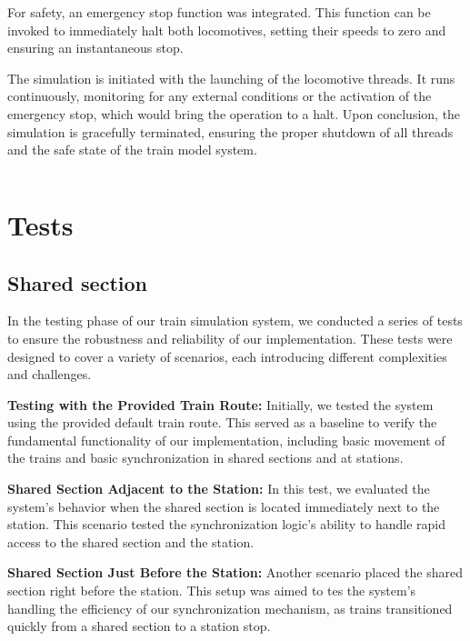 \documentclass{article}
\begin{document}
    For safety, an emergency stop function was integrated. This function can be invoked to immediately halt both locomotives, setting their speeds to zero and ensuring an instantaneous stop.

    The simulation is initiated with the launching of the locomotive threads. It runs continuously, monitoring for any external conditions or the activation of the emergency stop, which would bring the operation to a halt. Upon conclusion, the simulation is gracefully terminated, ensuring the proper shutdown of all threads and the safe state of the train model system.

    \begin{lstlisting}
    \end{lstlisting}


    \section{Tests}

    \subsection*{Shared section}
    In the testing phase of our train simulation system, we conducted a series of tests to ensure the robustness and reliability of our implementation. These tests were designed to cover a variety of scenarios, each introducing different complexities and challenges.

    \textbf{Testing with the Provided Train Route:} Initially, we tested the system using the provided default train route. This served as a baseline to verify the fundamental functionality of our implementation, including basic movement of the trains and basic synchronization in shared sections and at stations.

    \textbf{Shared Section Adjacent to the Station:} In this test, we evaluated the system's behavior when the shared section is located immediately next to the station. This scenario tested the synchronization logic's ability to handle rapid access to the shared section and the station.

    \textbf{Shared Section Just Before the Station:} Another scenario placed the shared section right before the station. This setup was aimed to tes the system's handling the efficiency of our synchronization mechanism, as trains transitioned quickly from a shared section to a station stop.
\end{document}
